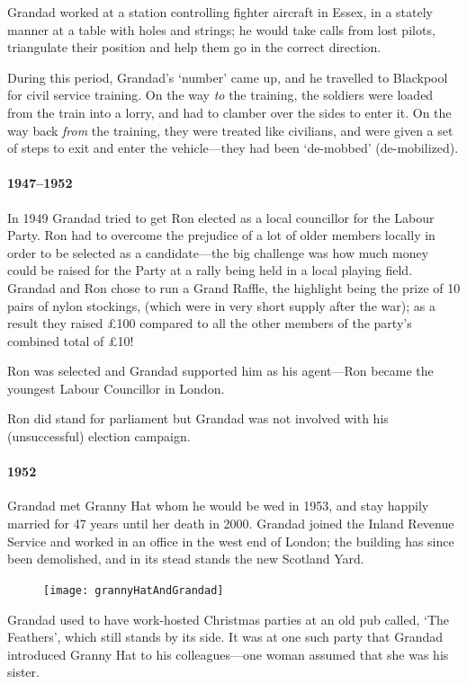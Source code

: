 Grandad worked at a station controlling fighter aircraft in Essex, in a stately manner at a table
with holes and strings; he would take calls from lost pilots, triangulate their position
and help them go in the correct direction.

During this period, Grandad's `number' came up, and he travelled to Blackpool for
civil service training. On the way \emph{to} the training, the soldiers were loaded from
the train into a lorry, and had to clamber over the sides to enter it. On the
way back \emph{from} the training, they were treated like civilians, and were
given a set of steps to exit and enter the vehicle---they had been `de-mobbed' (de-mobilized).

\paragraph{1947--1952} In 1949 Grandad tried to get Ron elected as a local
councillor for the Labour Party.  Ron had to overcome the
prejudice of a lot of older members locally in order to be selected as a candidate---the big challenge was
how much money could be raised for the Party at a rally being held
in a local playing field.
Grandad and Ron chose to run a Grand Raffle, the highlight being the
prize of 10 pairs of nylon stockings, (which were in very short supply
after the war); as a result they
raised \pounds100 compared to all the other members of the party's combined
total of \pounds10!

Ron was selected and Grandad supported him as his agent---Ron became
the youngest Labour Councillor in London.

Ron did stand for parliament but Grandad was not
involved with his (unsuccessful) election campaign.

\paragraph{1952} Grandad met Granny Hat whom he would be wed in 1953, and stay
happily married for 47 years until her death in 2000.
Grandad joined the Inland Revenue Service and worked in an office
in the west end of London; the building has since been demolished, and in its stead
stands the new Scotland Yard.

\begin{figure}
	\centering
	\texttt{[image: grannyHatAndGrandad]}
\end{figure}
Grandad used to have work-hosted Christmas parties at an old pub called, `The Feathers', which still stands by its side.
It was at one such party that Grandad introduced Granny Hat to his colleagues---one woman
assumed that she was his sister.

